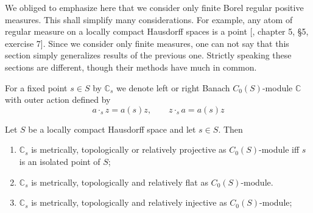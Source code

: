 We obliged to emphasize here that we consider only finite Borel regular positive
measures. This shall simplify many considerations. For example, any atom of
regular measure on a locally compact Hausdorff spaces is a point
[\cite{BourbElemMathIntegLivVI}, chapter 5, \S 5, exercise 7]. Since we consider
only finite measures, one can not say that this section simply generalizes
results of the previous one. Strictly speaking these sections are different,
though their methods have much in common.

For a fixed point $s\in S$ by $\mathbb{C}_s$ we denote left or right Banach
$C_0(S)$-module $\mathbb{C}$ with outer action defined by
$$
a\cdot_s z=a(s)z,\qquad z\cdot_s a=a(s)z
$$
\begin{proposition}\label{OneDimC0SModMetTopRelProjIngFlat} Let $S$ be a locally
compact Hausdorff space and let $s\in S$. Then 

\begin{enumerate}[label = (\roman*)]
    \item $\mathbb{C}_s$ is metrically, topologically or relatively projective 
    as $C_0(S)$-module iff $s$ is an isolated point of $S$;

    \item $\mathbb{C}_s$ is metrically, topologically and relatively flat as
    $C_0(S)$-module.

    \item $\mathbb{C}_s$ is metrically, topologically and relatively injective 
    as $C_0(S)$-module;

\end{enumerate}
\end{proposition}
